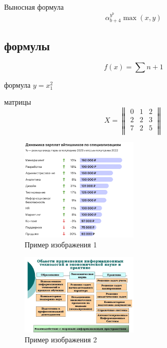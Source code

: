 Выносная формула 
\begin{equation}
    \alpha^{y^b}_{b+4}
    \max(x,y)
\end{equation}

\label{eq:strange}
\subsection{ формулы}
    \begin{equation}
    f(x)=\sum{n+1}
    \end{equation}

  формула  $y=x^2_1$


матрицы
    \begin{equation}
    X=
        \begin{Vmatrix}
        0 & 1 & 2 \\
        2 & 2 & 3 \\
        7 & 2 & 5 \\
        \end{Vmatrix}
    \end{equation}
\begin{figure}[h!]
    \centering
    \includegraphics[width=0.5\textwidth]{Picthers/example_image1.png}
    \caption{Пример изображения 1}
    \label{fig:image1}
\end{figure}


\begin{figure}[h!]
    \centering
    \includegraphics[width=0.5\textwidth]{Picthers/example_image2.png}
    \caption{Пример изображения 2}
    \label{fig:example_image2.png}
\end{figure}

